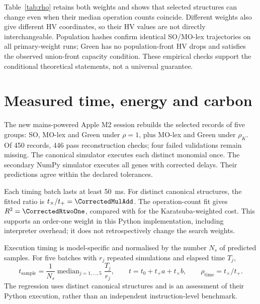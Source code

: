 \documentclass[11pt,a4paper]{article}
\theoremstyle{definition}
\theoremstyle{plain}
\theoremstyle{remark}
\begin{document}

Table~\ref{tab:rho} retains both weights and shows that selected structures can change even when their median operation counts coincide. Different weights also give different HV coordinates, so their HV values are not directly interchangeable. Population hashes confirm identical SO/MO-lex trajectories on all primary-weight runs; Green has no population-front HV drops and satisfies the observed union-front capacity condition. These empirical checks support the conditional theoretical statements, not a universal guarantee.

\section{Measured time, energy and carbon}
The new mains-powered Apple M2 session rebuilds the selected records of five groups: SO, MO-lex and Green under $\rho=1$, plus MO-lex and Green under $\rho_K$. Of 450 records, 446 pass reconstruction checks; four failed validations remain missing. The canonical simulator executes each distinct monomial once. The secondary NumPy simulator executes all genes with corrected delays. Their predictions agree within the declared tolerances.

Each timing batch lasts at least 50~ms. For \CorrectedNStructures{} distinct canonical structures, the fitted ratio is $t_\times/t_+=\CorrectedMulAdd$. The operation-count fit gives $R^2=\CorrectedRtwoOne$, compared with \CorrectedRtwoK{} for the Karatsuba-weighted cost. This supports an order-one weight in this Python implementation, including interpreter overhead; it does not retrospectively change the search weights.

Execution timing is model-specific and normalised by the number $N_s$ of predicted samples. For five batches with $r_j$ repeated simulations and elapsed time $T_j$,
\begin{equation}
t_{\mathrm{sample}}=\frac{1}{N_s}\operatorname{median}_{j=1,\ldots,5}\frac{T_j}{r_j},
\qquad t=t_0+t_+a+t_\times b,\qquad\rho_{\mathrm{time}}=t_\times/t_+.
\label{eq:timing}
\end{equation}
The regression uses distinct canonical structures and is an assessment of their Python execution, rather than an independent instruction-level benchmark.
\end{document}
